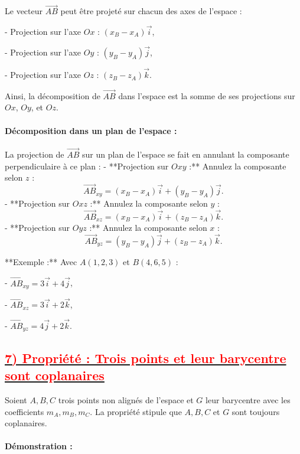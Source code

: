 \documentclass{article}
\begin{document}
Le vecteur \( \overrightarrow{AB} \) peut être projeté sur chacun des axes de l’espace :

- Projection sur l’axe \( Ox \) : \( (x_B - x_A)\vec{i} \),

- Projection sur l’axe \( Oy \) : \( (y_B - y_A)\vec{j} \),

- Projection sur l’axe \( Oz \) : \( (z_B - z_A)\vec{k} \).

Ainsi, la décomposition de \( \overrightarrow{AB} \) dans l’espace est la somme de ses projections sur \( Ox \), \( Oy \), et \( Oz \).

\paragraph{Décomposition dans un plan de l’espace :}

La projection de \( \overrightarrow{AB} \) sur un plan de l’espace se fait en annulant la composante perpendiculaire à ce plan :  
- **Projection sur \( Oxy \) :**  
  Annulez la composante selon \( z \) :  
  \[
  \overrightarrow{AB}_{xy} = (x_B - x_A)\vec{i} + (y_B - y_A)\vec{j}.
  \]
- **Projection sur \( Oxz \) :**  
  Annulez la composante selon \( y \) :  
  \[
  \overrightarrow{AB}_{xz} = (x_B - x_A)\vec{i} + (z_B - z_A)\vec{k}.
  \]
- **Projection sur \( Oyz \) :**  
  Annulez la composante selon \( x \) :  
  \[
  \overrightarrow{AB}_{yz} = (y_B - y_A)\vec{j} + (z_B - z_A)\vec{k}.
  \]

**Exemple :**  
Avec \( A(1, 2, 3) \) et \( B(4, 6, 5) \) :  

- \( \overrightarrow{AB}_{xy} = 3\vec{i} + 4\vec{j} \),  

- \( \overrightarrow{AB}_{xz} = 3\vec{i} + 2\vec{k} \),  

- \( \overrightarrow{AB}_{yz} = 4\vec{j} + 2\vec{k} \).

\subsection*{\underline{\textbf{\textcolor{red}{7) Propriété : Trois points et leur barycentre sont coplanaires}}}}

Soient \( A, B, C \) trois points non alignés de l’espace et \( G \) leur barycentre avec les coefficients \( m_A, m_B, m_C \).  
La propriété stipule que \( A, B, C \) et \( G \) sont toujours coplanaires.

\paragraph{Démonstration :}  
\end{document}
